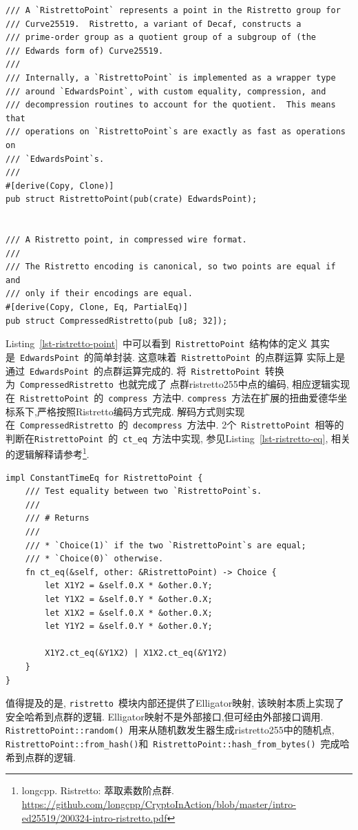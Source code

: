 \documentclass{article}
\newcommand{\code}[1]{\lstinline!#1!}
\begin{document}
\begin{lstlisting}[caption=\code{RistrettoPoint}~和~\code{CompressedRistretto}~定义, label=lst-ristretto-point]
/// A `RistrettoPoint` represents a point in the Ristretto group for
/// Curve25519.  Ristretto, a variant of Decaf, constructs a
/// prime-order group as a quotient group of a subgroup of (the
/// Edwards form of) Curve25519.
///
/// Internally, a `RistrettoPoint` is implemented as a wrapper type
/// around `EdwardsPoint`, with custom equality, compression, and
/// decompression routines to account for the quotient.  This means that
/// operations on `RistrettoPoint`s are exactly as fast as operations on
/// `EdwardsPoint`s.
///
#[derive(Copy, Clone)]
pub struct RistrettoPoint(pub(crate) EdwardsPoint);


/// A Ristretto point, in compressed wire format.
///
/// The Ristretto encoding is canonical, so two points are equal if and
/// only if their encodings are equal.
#[derive(Copy, Clone, Eq, PartialEq)]
pub struct CompressedRistretto(pub [u8; 32]);
\end{lstlisting}

Listing~\ref{lst-ristretto-point}~中可以看到~\code{RistrettoPoint}~结构体的定义
其实是~\code{EdwardsPoint}~的简单封装. 这意味着~\code{RistrettoPoint}~的点群运算
实际上是通过~\code{EdwardsPoint}~的点群运算完成的.
将~\code{RistrettoPoint}~转换为~\code{CompressedRistretto}~也就完成了
点群\textsf{ristretto255}中点的编码, 
相应逻辑实现在~\code{RistrettoPoint}~的~\code{compress}~方法中.
\code{compress}~方法在扩展的扭曲爱德华坐标系下,严格按照Ristretto编码方式完成.
解码方式则实现在~\code{CompressedRistretto}~的~\code{decompress}~方法中.
2个~\code{RistrettoPoint}~相等的判断在\code{RistrettoPoint}~的~\code{ct_eq}~方法中实现,
参见Listing~\ref{lst-ristretto-eq}, 相关的逻辑解释请参考\footnote{longcpp. Ristretto: 萃取素数阶点群.
\url{https://github.com/longcpp/CryptoInAction/blob/master/intro-ed25519/200324-intro-ristretto.pdf}}.

\begin{lstlisting}[caption=\code{RistrettoPoint}~的~\code{ct_eq}~方法, label=lst-ristretto-eq]
impl ConstantTimeEq for RistrettoPoint {
    /// Test equality between two `RistrettoPoint`s.
    ///
    /// # Returns
    ///
    /// * `Choice(1)` if the two `RistrettoPoint`s are equal;
    /// * `Choice(0)` otherwise.
    fn ct_eq(&self, other: &RistrettoPoint) -> Choice {
        let X1Y2 = &self.0.X * &other.0.Y;
        let Y1X2 = &self.0.Y * &other.0.X;
        let X1X2 = &self.0.X * &other.0.X;
        let Y1Y2 = &self.0.Y * &other.0.Y;

        X1Y2.ct_eq(&Y1X2) | X1X2.ct_eq(&Y1Y2)
    }
}
\end{lstlisting}
值得提及的是, \code{ristretto}~模块内部还提供了Elligator映射, 该映射本质上实现了安全哈希到点群的逻辑.
Elligator映射不是外部接口,但可经由外部接口调用.
\code{RistrettoPoint::random()}~用来从随机数发生器生成\textsf{ristretto255}中的随机点,
\code{RistrettoPoint::from_hash()}和~\code{RistrettoPoint::hash_from_bytes()}~完成哈希到点群的逻辑.
\end{document}
